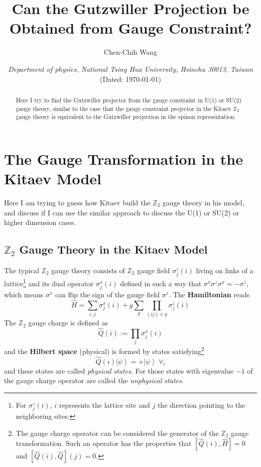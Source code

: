 \documentclass[12font]{article}
\title{\textbf{ Can the Gutzwiller Projection be Obtained from Gauge Constraint?}}
\author{Chen-Chih Wang  }
\date{\textit{Department of physics, National Tsing Hua University, Hsinchu 30013, Taiwan} \\ (Dated: \today)}
\newcommand{\ket}[1]{\left| #1 \right\rangle}
\begin{document}
\maketitle



\begin{abstract}
  Here I try to find the Gutzwiller projector from the gauge constraint in U(1) or SU(2) gauge theory, similar to the case that the gauge constraint projector in the Kitaev $\mathbb{Z}_2$ gauge theory is equivalent to the Gutzwiller projection in the spinon representation.
\end{abstract}

\section{The Gauge Transformation in the Kitaev Model}
Here I am trying to guess how Kitaev build the $\mathbb{Z}_2$ gauge theory in his model, and discuss if I can use the similar approach to discuss the U(1) or SU(2) or higher dimension cases.

\subsection{$\mathbb{Z}_2$ Gauge Theory in the Kitaev Model}
The typical $\mathbb{Z}_2$ gauge theory consists of $\mathbb{Z}_2$ gauge field $\sigma^z_j(i)$ living on links of a lattice\footnote{For $\sigma_j^z(i)$, $i$ represents the lattice site and $j$ the direction pointing to the neighboring sites.} and its dual operator $\sigma^x_j(i)$ defined in such a way that $\sigma^x\sigma^z\sigma^x = -\sigma^z$, which means $\sigma^x$ can flip the sign of the gauge field $\sigma^z$. The \textbf{Hamiltonian} reads
\[\hat{H} = \sum_{i,j}\sigma^x_j(i) + g\sum_{p}\prod_{(ij)\in p}\sigma^z_j(i)\]
The $\mathbb{Z}_2$ gauge charge is defined as
\[\hat{Q}(i):= \prod_{j}\sigma_j^x(i)\]
and the \textbf{Hilbert space} (physical) is formed by states satisfying\footnote{The gauge charge operator can be considered the generator of the $\mathbb{Z}_2$ gauge transformation. Such an operator has the properties that $[\hat{Q}(i),\hat{H}] = 0$ and $[\hat{Q}(i),\hat{Q}](j) = 0$.} 
\[\hat{Q}(i)\ket{\psi} = +\ket{\psi}\;\forall_i\]
and these states are called \emph{physical states}. For those states with eigenvalue $-1$ of the gauge charge operator are called the \emph{unphysical states}.
\end{document}
